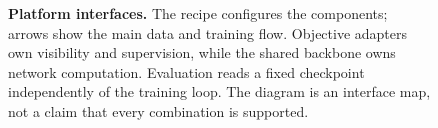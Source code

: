 \begin{figure}[t]
\caption{\textbf{Platform interfaces.} The recipe configures the components; arrows show the main data and training flow. Objective adapters own visibility and supervision, while the shared backbone owns network computation. Evaluation reads a fixed checkpoint independently of the training loop. The diagram is an interface map, not a claim that every combination is supported.}
\label{fig:platform-system}
\end{figure}
